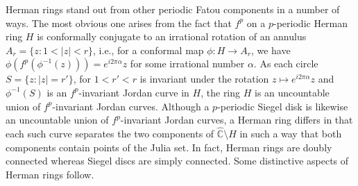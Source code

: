 \documentclass[12pt]{article}
\begin{document}
\par  Herman rings stand out from other periodic Fatou components in a number of ways. The most obvious one arises from the fact that $f^p$ on a $p$-periodic Herman ring $H$ is conformally conjugate to an irrational rotation of an annulus $A_r =\{z: 1< |z|<r\}$, i.e., for a conformal map $\phi: H \to A_r$, we have $\phi(f^p (\phi^{-1}(z)))= e^{i 2 \pi \alpha}z$ for some irrational number $\alpha$.  As each circle $S= \{z: |z|=r'\}$, for $1<r'<r$ is invariant under the rotation $z \mapsto e^{i 2 \pi \alpha}z$ and $\phi^{-1}(S)$ is an  $f^{p}$-invariant Jordan curve in $H$, the ring $H$  is an uncountable union of $f^{p}$-invariant Jordan curves. Although a $p$-periodic Siegel disk is likewise an uncountable union of $f^{p}$-invariant Jordan curves, a Herman ring differs in that each such curve separates the two components of $\widehat{\mathbb{C}}\setminus H$ in such a way that both components contain points of the Julia set.
In fact, Herman rings are  doubly connected whereas Siegel discs are simply connected. Some   distinctive aspects of Herman rings follow.
\end{document}
